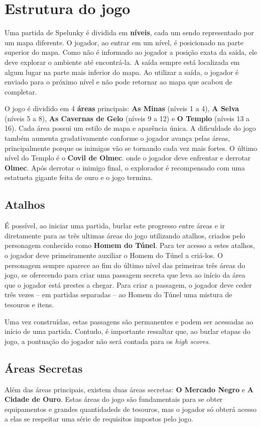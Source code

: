 \section{\label{section:spelunky-structure}Estrutura do jogo}
Uma partida de Spelunky é dividida em \textbf{níveis}, cada um sendo
representado por um mapa diferente. O jogador, ao entrar em um nível, é
posicionado na parte superior do mapa. Como não é informado ao jogador a posição
exata da saída, ele deve explorar o ambiente até encontrá-la. A saída sempre
está localizada em algum lugar na parte mais inferior do mapa. Ao utilizar a
saída, o jogador é enviado para o próximo nível e não pode retornar ao mapa que
acabou de completar.

O jogo é dividido em 4 \textbf{áreas} principais: \textbf{As Minas} (níveis 1 a
4), \textbf{A Selva} (níveis 5 a 8), \textbf{As Cavernas de Gelo} (níveis 9 a
12) e \textbf{O Templo} (níveis 13 a 16). Cada área possui um estilo de mapa e
aparência única. A dificuldade do jogo também aumenta gradativamente conforme o
jogador avança pelas áreas, principalmente porque os inimigos vão se tornando
cada vez mais fortes. O último nível do Templo é o \textbf{Covil de Olmec}. onde
o jogador deve enfrentar e derrotar \textbf{Olmec}. Após derrotar o inimigo
final, o explorador é recompensado com uma estatueta gigante feita de ouro e o
jogo termina.


\subsection{Atalhos}
É possível, ao iniciar uma partida, burlar este progresso entre áreas e ir
diretamente para as três ultimas áreas do jogo utilizando atalhos, criados pelo
personagem conhecido como \textbf{Homem do Túnel}. Para ter acesso a estes
atalhos, o jogador deve primeiramente auxiliar o Homem do Túnel a criá-los. O
personagem sempre aparece ao fim do último nível das primeiras três áreas do
jogo, se oferecendo para criar uma passagem secreta que leva ao início da área
que o jogador está prestes a chegar. Para criar a passagem, o jogador deve ceder
três vezes -- em partidas separadas -- ao Homem do Túnel uma mistura de tesouros
e itens.

Uma vez construídas, estas passagens são permanentes e podem ser acessadas ao
início de uma partida. Contudo, é importante ressaltar que, ao burlar etapas do
jogo, a pontuação do jogador não será contada para os \textit{high scores}.


\subsection{Áreas Secretas}
Além das áreas principais, existem duas áreas secretas: \textbf{O Mercado Negro}
e \textbf{A Cidade de Ouro}. Estas áreas do jogo são fundamentais para se obter
equipamentos e grandes quantidadeds de tesouros, mas o jogador só obterá acesso
a elas se respeitar uma série de requisitos impostos pelo jogo.

